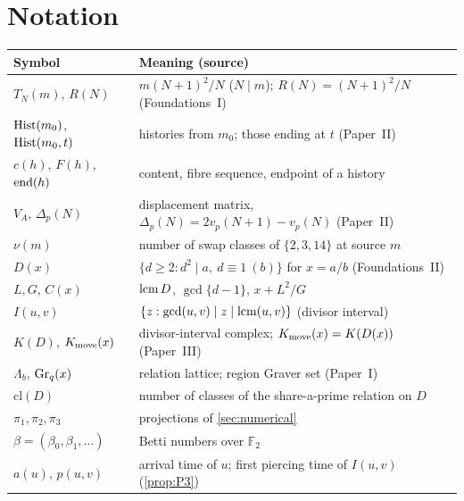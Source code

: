 \section{Notation}\label{app:notation}
\begin{center}\small\begin{tabular}{@{}lp{10.2cm}@{}}\toprule
Symbol & Meaning (source)\\\midrule
$T_N(m)$, $R(N)$ & $m(N+1)^2/N$ ($N\mid m$); $R(N)=(N+1)^2/N$ (Foundations~I)\\
$\mathrm{Hist}(m_0)$, $\mathrm{Hist}(m_0,t)$ & histories from $m_0$; those ending at $t$ (Paper~II)\\
$c(h)$, $F(h)$, $\operatorname{end}(h)$ & content, fibre sequence, endpoint of a history\\
$V_A$, $\Delta_p(N)$ & displacement matrix, $\Delta_p(N)=2v_p(N+1)-v_p(N)$ (Paper~II)\\
$\nu(m)$ & number of swap classes of $\{2,3,14\}$ at source $m$\\
$D(x)$ & $\{d\ge2:d^2\mid a,\ d\equiv1\ (b)\}$ for $x=a/b$ (Foundations~II)\\
$L,G$, $C(x)$ & $\operatorname{lcm} D$, $\gcd\{d-1\}$, $x+L^2/G$\\
$I(u,v)$ & $\{z:\gcd(u,v)\mid z\mid\operatorname{lcm}(u,v)\}$ (divisor interval)\\
$K(D)$, $K_{\mathrm{move}}(x)$ & divisor-interval complex; $K_{\mathrm{move}}(x)=K(D(x))$ (Paper~III)\\
$\Lambda_b$, $\mathrm{Gr}_q(x)$ & relation lattice; region Graver set (Paper~I)\\
$\mathrm{cl}(D)$ & number of classes of the share-a-prime relation on $D$\\
$\pi_1,\pi_2,\pi_3$ & projections of \cref{sec:numerical}\\
$\beta=(\beta_0,\beta_1,\dots)$ & Betti numbers over $\mathbb F_2$\\
$a(u)$, $p(u,v)$ & arrival time of $u$; first piercing time of $I(u,v)$ (\cref{prop:P3})\\
\bottomrule\end{tabular}\end{center}
